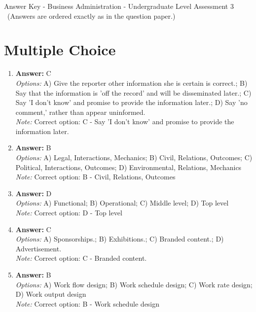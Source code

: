 \documentclass[12pt]{article}
\begin{document}
\begin{center}
Answer Key - Business Administration - Undergraduate Level Assessment 3 \
\small (Answers are ordered exactly as in the question paper.)
\end{center}

\section*{Multiple Choice}
\begin{enumerate}[label=\arabic*.]
\item \textbf{Answer:} C
\\ \textit{Options:} A) Give the reporter other information she is certain is correct.; B) Say that the information is 'off the record' and will be disseminated later.; C) Say 'I don't know' and promise to provide the information later.; D) Say 'no comment,' rather than appear uninformed.
\\ \textit{Note:} Correct option: C - Say 'I don't know' and promise to provide the information later.
\item \textbf{Answer:} B
\\ \textit{Options:} A) Legal, Interactions, Mechanics; B) Civil, Relations, Outcomes; C) Political, Interactions, Outcomes; D) Environmental, Relations, Mechanics
\\ \textit{Note:} Correct option: B - Civil, Relations, Outcomes
\item \textbf{Answer:} D
\\ \textit{Options:} A) Functional; B) Operational; C) Middle level; D) Top level
\\ \textit{Note:} Correct option: D - Top level
\item \textbf{Answer:} C
\\ \textit{Options:} A) Sponsorships.; B) Exhibitions.; C) Branded content.; D) Advertisement.
\\ \textit{Note:} Correct option: C - Branded content.
\item \textbf{Answer:} B
\\ \textit{Options:} A) Work flow design; B) Work schedule design; C) Work rate design; D) Work output design
\\ \textit{Note:} Correct option: B - Work schedule design
\end{enumerate}
\end{document}
